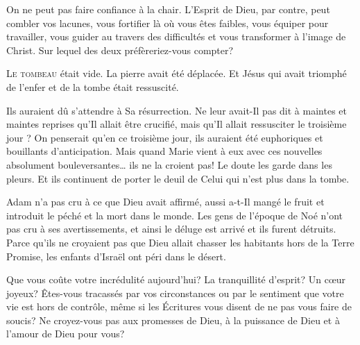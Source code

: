 On ne peut pas faire confiance à la chair.
 L'Esprit de Dieu, par contre, peut combler vos lacunes,
 vous fortifier là où vous êtes faibles, vous équiper pour travailler,
 vous guider au travers des difficultés et vous transformer
 à l'image de Christ. Sur lequel des deux préfèreriez-vous compter?


\dvrule






\lettrine{L}{e tombeau} était vide. La pierre avait été déplacée.
 Et Jésus \ocadr qui avait triomphé de l'enfer et de la tombe \fcadr{}
 était ressuscité.

Ils auraient dû s'attendre à Sa résurrection.
 Ne leur avait-Il pas dit à maintes et maintes reprises
 qu'Il allait être crucifié, mais qu'Il allait ressusciter le troisième jour ?
 On penserait qu'en ce troisième jour, ils auraient été euphoriques
 et bouillants  d'anticipation.
 Mais quand Marie vient à eux avec ces nouvelles absolument
 bouleversantes\dots{} ils ne la croient pas!
 Le doute les garde dans les pleurs. Et ils continuent de porter
 le deuil de Celui qui n'est plus dans la tombe.


Adam n'a pas cru à ce que Dieu avait affirmé, aussi a-t-Il mangé
 le fruit et introduit le péché et la mort dans le monde.
 Les gens de l'époque de Noé n'ont pas cru à ses avertissements,
 et ainsi le déluge est arrivé et ils furent détruits.
 Parce qu'ils ne croyaient pas que Dieu allait chasser les habitants
 hors de la Terre Promise, les enfants d'Israël ont péri dans le désert.

Que vous coûte votre incrédulité aujourd'hui?
 La tranquillité d'esprit? Un c\oe{}ur joyeux?
 Êtes-vous tracassés par vos circonstances ou par le sentiment
 que votre vie est hors de contrôle, même si les Écritures vous disent
 de ne pas vous faire de soucis? Ne croyez-vous pas aux promesses de Dieu,
 à la puissance de Dieu et à l'amour de Dieu pour vous?

